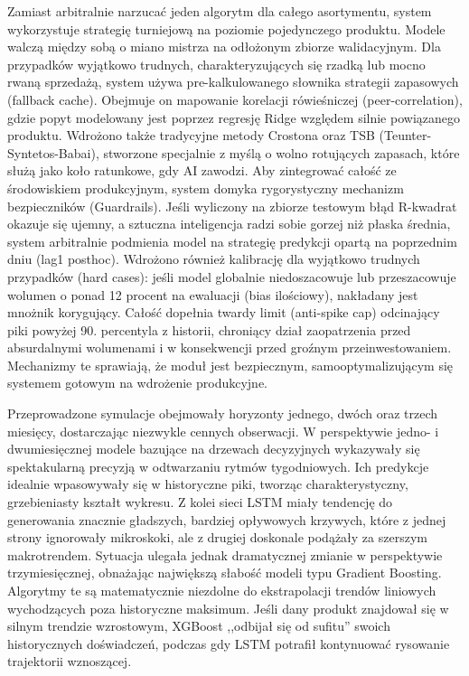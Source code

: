 \documentclass[12pt,a4paper]{article}
\begin{document}
Zamiast arbitralnie narzucać jeden algorytm dla całego asortymentu, system wykorzystuje strategię turniejową na poziomie pojedynczego produktu. Modele walczą między sobą o miano mistrza na odłożonym zbiorze walidacyjnym. Dla przypadków wyjątkowo trudnych, charakteryzujących się rzadką lub mocno rwaną sprzedażą, system używa pre-kalkulowanego słownika strategii zapasowych (fallback cache). Obejmuje on mapowanie korelacji rówieśniczej (peer-correlation), gdzie popyt modelowany jest poprzez regresję Ridge względem silnie powiązanego produktu. Wdrożono także tradycyjne metody Crostona oraz TSB (Teunter-Syntetos-Babai), stworzone specjalnie z myślą o wolno rotujących zapasach, które służą jako koło ratunkowe, gdy AI zawodzi. Aby zintegrować całość ze środowiskiem produkcyjnym, system domyka rygorystyczny mechanizm bezpieczników (Guardrails). Jeśli wyliczony na zbiorze testowym błąd R-kwadrat okazuje się ujemny, a sztuczna inteligencja radzi sobie gorzej niż płaska średnia, system arbitralnie podmienia model na strategię predykcji opartą na poprzednim dniu (lag1 posthoc). Wdrożono również kalibrację dla wyjątkowo trudnych przypadków (hard cases): jeśli model globalnie niedoszacowuje lub przeszacowuje wolumen o ponad 12 procent na ewaluacji (bias ilościowy), nakładany jest mnożnik korygujący. Całość dopełnia twardy limit (anti-spike cap) odcinający piki powyżej 90. percentyla z historii, chroniący dział zaopatrzenia przed absurdalnymi wolumenami i w konsekwencji przed groźnym przeinwestowaniem. Mechanizmy te sprawiają, że moduł jest bezpiecznym, samooptymalizującym się systemem gotowym na wdrożenie produkcyjne.

Przeprowadzone symulacje obejmowały horyzonty jednego, dwóch oraz trzech miesięcy, dostarczając niezwykle cennych obserwacji. W perspektywie jedno- i dwumiesięcznej modele bazujące na drzewach decyzyjnych wykazywały się spektakularną precyzją w odtwarzaniu rytmów tygodniowych. Ich predykcje idealnie wpasowywały się w historyczne piki, tworząc charakterystyczny, grzebieniasty kształt wykresu. Z kolei sieci LSTM miały tendencję do generowania znacznie gładszych, bardziej opływowych krzywych, które z jednej strony ignorowały mikroskoki, ale z drugiej doskonale podążały za szerszym makrotrendem. Sytuacja ulegała jednak dramatycznej zmianie w perspektywie trzymiesięcznej, obnażając największą słabość modeli typu Gradient Boosting. Algorytmy te są matematycznie niezdolne do ekstrapolacji trendów liniowych wychodzących poza historyczne maksimum. Jeśli dany produkt znajdował się w silnym trendzie wzrostowym, XGBoost ,,odbijał się od sufitu'' swoich historycznych doświadczeń, podczas gdy LSTM potrafił kontynuować rysowanie trajektorii wznoszącej.
\end{document}
